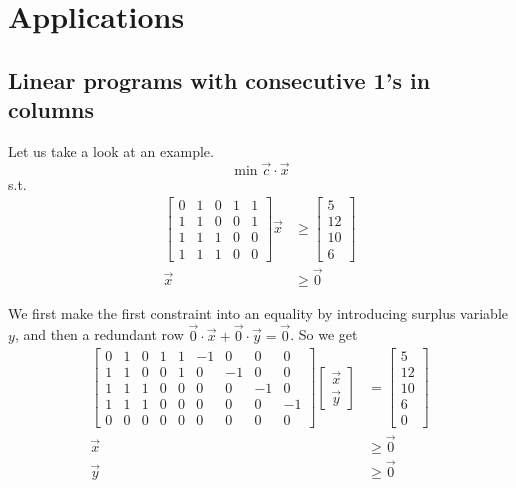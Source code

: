 \documentclass[UTF8,a4paper]{ctexart}
\begin{document}
\section{Applications}

\subsection{Linear programs with consecutive 1's in columns}

Let us take a look at an example.
\[
    \min \vec{c}\cdot \vec{x}
\]
s.t.
\begin{align*}
    \begin{bmatrix}
        0&1&0&1&1\\
        1&1&0&0&1\\
        1&1&1&0&0\\
        1&1&1&0&0
    \end{bmatrix}
    \vec{x} &\geq \begin{bmatrix}
        5\\
        12\\
        10\\
        6
    \end{bmatrix}
    \\
    \vec{x}&\geq \vec{0}
\end{align*}

We first make the first constraint into an equality by introducing surplus variable $y$,
and then a redundant row $\vec{0}\cdot \vec{x} + \vec{0}\cdot \vec{y}=\vec{0}$.
So we get
\begin{align*}
    \begin{bmatrix}
        0&1&0&1&1& -1&0&0&0\\
        1&1&0&0&1& 0&-1&0&0\\
        1&1&1&0&0& 0&0&-1&0\\
        1&1&1&0&0& 0&0&0&-1\\
        0&0&0&0&0& 0&0&0&0
    \end{bmatrix}
    \begin{bmatrix}
        \vec{x}\\
        \vec{y}
    \end{bmatrix}
    &=\begin{bmatrix}
        5\\
        12\\
        10\\
        6\\
        0
    \end{bmatrix}
    \\ \vec{x}&\geq \vec{0}
    \\ \vec{y}&\geq \vec{0}
\end{align*}
\end{document}
